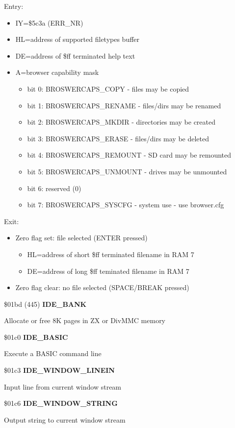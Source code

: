 Entry:
\begin{itemize}
\item[] IY=\$5c3a (ERR\_NR)
\item[] HL=address of supported filetypes buffer
\item[] DE=address of \$ff terminated help text
\item[] A=browser capability mask
  \begin{itemize}
  \item[] bit 0: BROSWERCAPS\_COPY - files may be copied
  \item[] bit 1: BROSWERCAPS\_RENAME - files/dirs may be renamed
  \item[] bit 2: BROSWERCAPS\_MKDIR - directories may be created
  \item[] bit 3: BROSWERCAPS\_ERASE - files/dirs may be deleted
  \item[] bit 4: BROSWERCAPS\_REMOUNT - SD card may be remounted
  \item[] bit 5: BROSWERCAPS\_UNMOUNT - drives may be unmounted
  \item[] bit 6: reserved (0)
  \item[] bit 7: BROSWERCAPS\_SYSCFG - system use - use browser.cfg
  \end{itemize}
\end{itemize}
Exit:
\begin{itemize}
\item[] Zero flag set: file selected (ENTER pressed)
  \begin{itemize}
  \item[] HL=address of short \$ff terminated filename in RAM 7
  \item[] DE=address of long \$ff teminated filename in RAM 7
  \end{itemize}
\item[] Zero flag clear: no file selected (SPACE/BREAK pressed)
\end{itemize}

\$01bd (445) \textbf{IDE\_BANK}

Allocate or free 8K pages in ZX or DivMMC memory

\$01c0 \textbf{IDE\_BASIC}

Execute a BASIC command line

\$01c3 \textbf{IDE\_WINDOW\_LINEIN}

Input line from current window stream

\$01c6 \textbf{IDE\_WINDOW\_STRING}

Output string to current window stream

